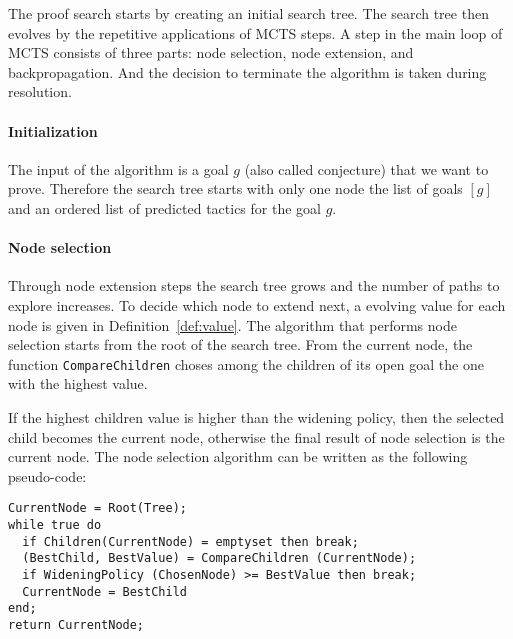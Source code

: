 \documentclass[runningheads,a4paper,draft]{svjour3}
\begin{document}
The proof search starts by creating an initial search tree. The search tree 
then evolves by the repetitive applications of MCTS steps. A step in the main 
loop of MCTS consists of three parts: node selection, node extension, and 
backpropagation. And the decision to terminate the algorithm is taken during
resolution. 

\paragraph{Initialization}
The input of the algorithm is a goal $g$ (also called conjecture) that we 
want to prove.
Therefore the search tree starts with only one node the list of goals
$[g]$ and an ordered list of predicted tactics for the goal $g$.


\paragraph{Node selection}
Through node extension steps the search tree grows and the number of paths to
explore increases. To decide which node to extend next, a evolving value for
each node is given in Definition~\ref{def:value}. The algorithm that performs
node selection starts from the root of the search tree. From the current node,
the function \texttt{CompareChildren} choses among the children of its open 
goal the one with the highest value.

If the highest children value is higher than the widening policy, then the 
selected child
becomes the current node, otherwise the final result of node selection is the
current node. The node selection algorithm can be written as the following
pseudo-code:

\begin{lstlisting}[language=SMLSmall]
CurrentNode = Root(Tree);
while true do
  if Children(CurrentNode) = emptyset then break;
  (BestChild, BestValue) = CompareChildren (CurrentNode);
  if WideningPolicy (ChosenNode) >= BestValue then break;
  CurrentNode = BestChild
end;
return CurrentNode;
\end{lstlisting}
\end{document}
